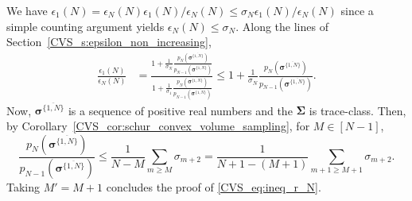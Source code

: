 \documentclass[twoside,11pt]{book}
\numberwithin{theorem}{chapter}
\numberwithin{definition}{chapter}
\numberwithin{proposition}{chapter}
\numberwithin{corollary}{chapter}
\numberwithin{example}{chapter}
\numberwithin{lemma}{chapter}
\numberwithin{assumption}{chapter}
\numberwithin{equation}{chapter}
\numberwithin{figure}{chapter}
\begin{document}
We have
$\epsilon_{1}(N) = \epsilon_{N}(N)\epsilon_{1}(N)/\epsilon_{N}(N) \leq \sigma_{N} \epsilon_{1}(N)/\epsilon_{N}(N)$ since a simple counting argument yields $ \epsilon_{N}(N) \leq \sigma_{N}$.
Along the lines of Section~\ref{CVS_s:epsilon_non_increasing},
\begin{align}
\frac{\epsilon_{1}(N)}{\epsilon_{N}(N)} & = \frac{1  + \frac{1}{\sigma_{N}}\frac{p_{N} \left(\bm{\sigma}^{\overline{\{1,N \}}} \right) }{ p_{N-1} \left(\bm{\sigma}^{\overline{\{1,N \}}} \right)} }{1  + \frac{1}{\sigma_{1} }\frac{p_{N} \left(\bm{\sigma}^{\overline{\{1,N \}}} \right) }{p_{N-1} \left(\bm{\sigma}^{\overline{\{1,N \}}} \right)}}
\leq 1  + \frac{1}{\sigma_{N}}\frac{p_{N} \left(\bm{\sigma}^{\overline{\{1,N \}}} \right) }{ p_{N-1} \left(\bm{\sigma}^{\overline{\{1,N \}}} \right)}.
\end{align}
Now, $\bm{\sigma}^{\overline{\{1,N \}}}$ is a sequence of positive real numbers and the $\bm{\Sigma}$ is trace-class. Then, by Corollary~\ref{CVS_cor:schur_convex_volume_sampling}, for $M \in [N-1]$,
\begin{equation}
\frac{p_{N} \left(\bm{\sigma}^{\overline{\{1,N \}}}  \right) }{ p_{N-1} \left(\bm{\sigma}^{\overline{\{1,N \}}}  \right)} \leq \frac{1 }{N-M} \sum_{ m \geq M} \sigma_{m+2} = \frac{1 }{N+1-(M+1)} \sum_{ m+1 \geq M+1} \sigma_{m+2}.
\end{equation}
Taking $M'= M+1$ concludes the proof of \eqref{CVS_eq:ineq_r_N}.


\end{document}
